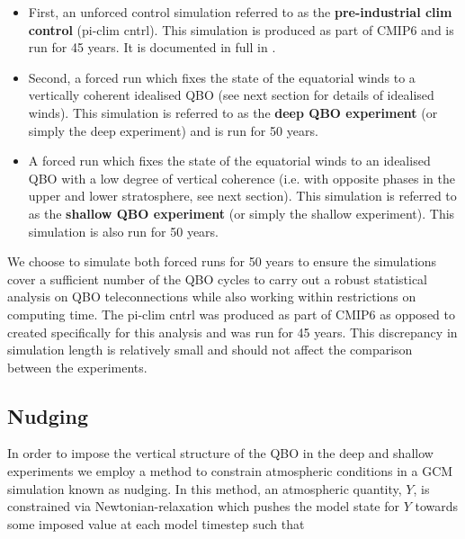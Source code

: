 \begin{itemize}
    \item First, an unforced control simulation referred to as the \textbf{pre-industrial clim control} (pi-clim cntrl). This simulation is produced as part of CMIP6 and is run for 45 years. It is documented in full in \cite{oconnorAssessment2021b}. 
    
    \item Second, a forced run which fixes the state of the equatorial winds to a vertically coherent idealised QBO (see next section for details of idealised winds). This simulation is referred to as the \textbf{deep QBO experiment} (or simply the deep experiment) and is run for 50 years.
    
    \item A forced run which fixes the state of the equatorial winds to an idealised QBO with a low degree of vertical coherence (i.e. with opposite phases in the upper and lower stratosphere, see next section). This simulation is referred to as the \textbf{shallow QBO experiment} (or simply the shallow experiment). This simulation is also run for 50 years.
    
\end{itemize}

We choose to simulate both forced runs for 50 years to ensure the simulations cover a sufficient number of the QBO cycles to carry out a robust statistical analysis on QBO teleconnections while also working within restrictions on computing time. The pi-clim cntrl was produced as part of CMIP6 as opposed to created specifically for this analysis and was run for 45 years. This discrepancy in simulation length is relatively small and should not affect the comparison between the experiments. 



\subsection{Nudging}
In order to impose the vertical structure of the QBO in the deep and shallow experiments we employ a method to constrain atmospheric conditions in a GCM simulation known as nudging. In this method, an atmospheric quantity, $Y$, is constrained via Newtonian-relaxation which pushes the model state for $Y$ towards some imposed value at each model timestep such that

